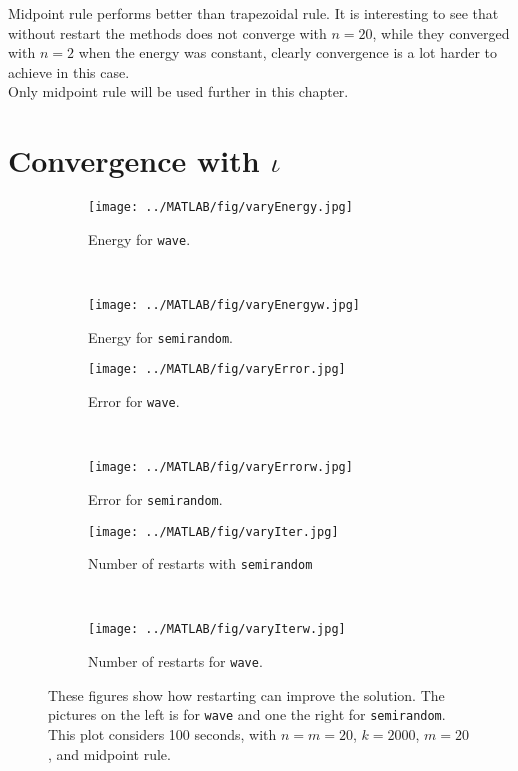 Midpoint rule performs better than trapezoidal rule. It is interesting to see that without restart the methods does not converge with $n = 20$, while they converged with $n = 2$ when the energy was constant, clearly convergence is a lot harder to achieve in this case. \\
Only midpoint rule will be used further in this chapter.\\

\section{Convergence with $\iota$} %

\begin{figure}[H]
        \centering
        \begin{subfigure}[b]{0.45\textwidth}
                \texttt{[image: ../MATLAB/fig/varyEnergy.jpg]}
                \caption{ Energy for \texttt{wave}. }
                \label{fig:varyEnergy}
        \end{subfigure}%
        ~
        \begin{subfigure}[b]{0.45\textwidth}
                \texttt{[image: ../MATLAB/fig/varyEnergyw.jpg]}
                \caption{ Energy for \texttt{semirandom}. }
                \label{fig:varyEnergyw}
        \end{subfigure}
		
		\begin{subfigure}[b]{0.45\textwidth}
                \texttt{[image: ../MATLAB/fig/varyError.jpg]}
                \caption{ Error for \texttt{wave}. }
                \label{fig:varyError}
        \end{subfigure}%
        ~
        \begin{subfigure}[b]{0.45\textwidth}
                \texttt{[image: ../MATLAB/fig/varyErrorw.jpg]}
                \caption{ Error for \texttt{semirandom}. }
                \label{fig:varyErrorw}
        \end{subfigure}
        
        		\begin{subfigure}[b]{0.45\textwidth}
                \texttt{[image: ../MATLAB/fig/varyIter.jpg]}
                \caption{ Number of restarts with \texttt{semirandom} }
                \label{fig:varyIter}
        \end{subfigure}%
        ~
        \begin{subfigure}[b]{0.45\textwidth}
                \texttt{[image: ../MATLAB/fig/varyIterw.jpg]}
                \caption{ Number of restarts for \texttt{wave}. }
                \label{fig:varyIterw}
        \end{subfigure}
        \caption{ These figures show how restarting can improve the solution. The pictures on the left is for \texttt{wave} and one the right for \texttt{semirandom}. This plot considers 100 seconds, with  $n=m=20$, $k = 2000$, $m = 20$, and midpoint rule. }
        \label{fig:variota}
\end{figure}
